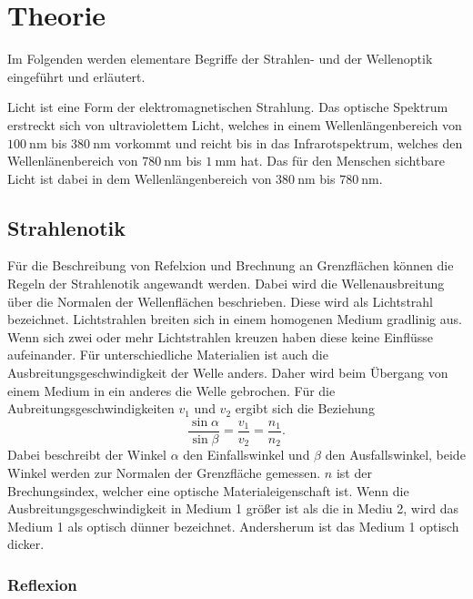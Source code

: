 \section{Theorie}
\label{sec:theorie}

Im Folgenden werden elementare Begriffe der Strahlen- und der Wellenoptik eingeführt und erläutert.

Licht ist eine Form der elektromagnetischen Strahlung. Das optische Spektrum erstreckt sich von ultraviolettem Licht, welches 
in einem Wellenlängenbereich von $\SI{100}{\nano\meter}$ bis $\SI{380}{\nano\meter}$ vorkommt und reicht bis in das Infrarotspektrum, welches 
den Wellenlänenbereich von $\SI{780}{\nano\meter}$ bis $\SI{1}{\milli\meter}$ hat. Das für den Menschen sichtbare Licht ist dabei in dem 
Wellenlängenbereich von $\SI{380}{\nano\meter}$ bis $\SI{780}{\nano\meter}$.

\subsection{Strahlenotik}
\label{sec:Strahlenotik}
 
Für die Beschreibung von Refelxion und Brechnung an Grenzflächen können die Regeln der Strahlenotik angewandt werden.
Dabei wird die Wellenausbreitung über die Normalen der Wellenflächen beschrieben. Diese wird als Lichtstrahl bezeichnet.
Lichtstrahlen breiten sich in einem homogenen Medium gradlinig aus. Wenn sich zwei oder mehr Lichtstrahlen kreuzen haben diese
keine Einflüsse aufeinander.
Für unterschiedliche Materialien ist auch die Ausbreitungsgeschwindigkeit der Welle anders. Daher wird beim Übergang von einem
Medium in ein anderes die Welle gebrochen. Für die Aubreitungsgeschwindigkeiten $v_1$ und $v_2$ ergibt sich die Beziehung
\begin{equation}
    \frac{\sin \alpha}{\sin \beta} =\frac{v_1}{v_2} = \frac{n_1}{n_2}.
    \label{eqn:bez}
\end{equation}
Dabei beschreibt der Winkel $\alpha$ den Einfallswinkel und $\beta$ den Ausfallswinkel, beide Winkel werden  zur Normalen der Grenzfläche gemessen. 
$n$ ist der Brechungsindex, welcher eine optische Materialeigenschaft ist.
Wenn die Ausbreitungsgeschwindigkeit in Medium 1 größer ist als die in Mediu  2, wird das Medium 1 als optisch dünner 
bezeichnet. Andersherum ist das Medium 1 optisch dicker.

\subsubsection{Reflexion}
\label{sec:Reflexion}

